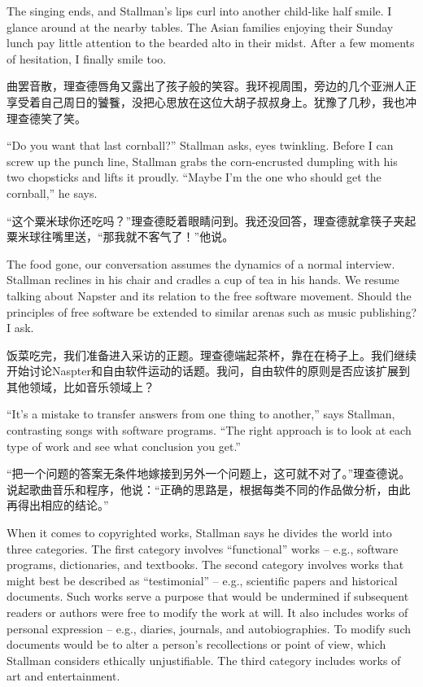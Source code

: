 \ifdefined\eng
The singing ends, and Stallman's lips curl into another child-like half smile. I glance around at the nearby tables. The Asian families enjoying their Sunday lunch pay little attention to the bearded alto in their midst. After a few moments of hesitation, I finally smile too.
\fi

\ifdefined\chs
曲罢音散，理查德唇角又露出了孩子般的笑容。我环视周围，旁边的几个亚洲人正享受着自己周日的饕餮，没把心思放在这位大胡子叔叔身上。犹豫了几秒，我也冲理查德笑了笑。
\fi

\ifdefined\eng
``Do you want that last cornball?'' Stallman asks, eyes twinkling. Before I can screw up the punch line, Stallman grabs the corn-encrusted dumpling with his two chopsticks and lifts it proudly. ``Maybe I'm the one who should get the cornball,'' he says.
\fi

\ifdefined\chs
“这个粟米球你还吃吗？”理查德眨着眼睛问到。我还没回答，理查德就拿筷子夹起粟米球往嘴里送，“那我就不客气了！”他说。
\fi

\ifdefined\eng
The food gone, our conversation assumes the dynamics of a normal interview. Stallman reclines in his chair and cradles a cup of tea in his hands. We resume talking about Napster and its relation to the free software movement. Should the principles of free software be extended to similar arenas such as music publishing? I ask.
\fi

\ifdefined\chs
饭菜吃完，我们准备进入采访的正题。理查德端起茶杯，靠在在椅子上。我们继续开始讨论Naspter和自由软件运动的话题。我问，自由软件的原则是否应该扩展到其他领域，比如音乐领域上？
\fi

\ifdefined\eng
``It's a mistake to transfer answers from one thing to another,'' says Stallman, contrasting songs with software programs. ``The right approach is to look at each type of work and see what conclusion you get.''
\fi

\ifdefined\chs
“把一个问题的答案无条件地嫁接到另外一个问题上，这可就不对了。”理查德说。说起歌曲音乐和程序，他说：“正确的思路是，根据每类不同的作品做分析，由此再得出相应的结论。”
\fi

\ifdefined\eng
When it comes to copyrighted works, Stallman says he divides the world into three categories. The first category involves ``functional'' works -- e.g., software programs, dictionaries, and textbooks. The second category involves works that might best be described as ``testimonial'' -- e.g., scientific papers and historical documents. Such works serve a purpose that would be undermined if subsequent readers or authors were free to modify the work at will.  It also includes works of personal expression -- e.g., diaries, journals, and autobiographies. To modify such documents would be to alter a person's recollections or point of view, which Stallman considers ethically unjustifiable.  The third category includes works of art and entertainment.
\fi

